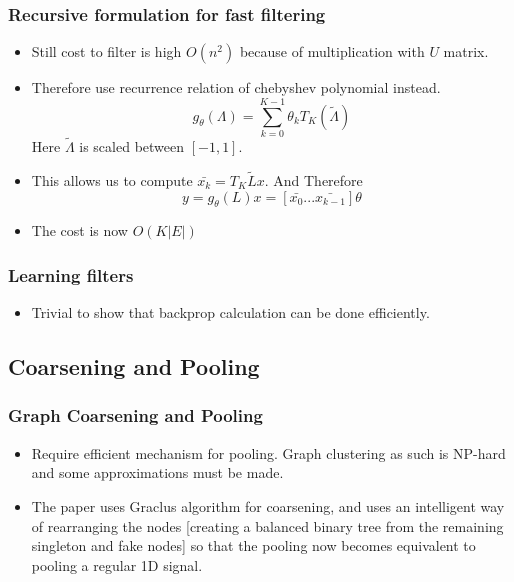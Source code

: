 \documentclass{beamer}
\begin{document}
\begin{frame}
  \frametitle{Recursive formulation for fast filtering}
  \begin{itemize}
  \item Still cost to filter is high $O(n^2)$ because of multiplication with $U$ matrix.
  \item Therefore use recurrence relation of chebyshev polynomial instead.
    $$g_{\theta}(\Lambda) = \sum_{k=0}^{K-1}\theta_k T_K(\tilde{\Lambda})$$
    Here $\tilde{\Lambda}$ is scaled between $[-1,1]$.
  \item This allows us to compute $\bar{x_k} = T_K{\tilde{L}}x$. And Therefore
    $$ y = g_{\theta}(L)x = [\bar{x_0}...\bar{x_{k-1}}]\theta$$
  \item The cost is now $O(K|E|)$
  \end{itemize}
\end{frame}

\begin{frame}
  \frametitle{Learning filters}
  \begin{itemize}
  \item Trivial to show that backprop calculation can be done efficiently.
  \end{itemize}
\end{frame}

\subsection{Coarsening and Pooling}
\begin{frame}
  \frametitle{Graph Coarsening and Pooling}
  \begin{itemize}
  \item Require efficient mechanism for pooling. Graph clustering as such is NP-hard and some approximations must be made.
  \item The paper uses Graclus algorithm for coarsening, and uses an intelligent way of rearranging the nodes [creating a balanced binary tree from the remaining singleton and fake nodes] so that the pooling now becomes equivalent to pooling a regular 1D signal.
  \end{itemize}
\end{frame}
\end{document}

